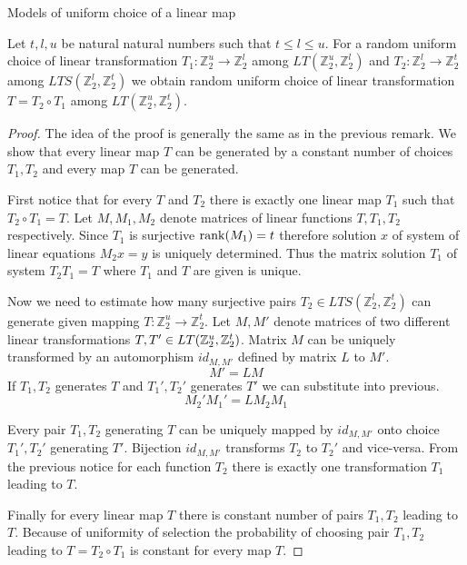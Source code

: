 \begin{section}{Models of uniform choice of a linear map}
\begin{remark}
Let $t, l, u$ be natural natural numbers such that $t \leq l \leq u$. For a random uniform choice of linear transformation $T_1: \mathbb{Z}_2^u \rightarrow \mathbb{Z}_2^l$ among $LT(\mathbb{Z}_2^u, \mathbb{Z}_2^l)$ and $T_2: \mathbb{Z}_2^l \rightarrow \mathbb{Z}_2^t$ among $LTS(\mathbb{Z}_2^l, \mathbb{Z}_2^t)$ we obtain random uniform choice of linear transformation $T = T_2 \circ T_1$ among $LT(\mathbb{Z}_2^u, \mathbb{Z}_2^t)$.
\end{remark}
\begin{proof}
The idea of the proof is generally the same as in the previous remark. We show that every linear map $T$ can be generated by a constant number of choices $T_1, T_2$ and every map $T$ can be generated.

First notice that for every $T$ and $T_2$ there is exactly one linear map $T_1$ such that $T_2 \circ T_1 = T$. Let $M, M_1, M_2$ denote matrices of linear functions $T, T_1, T_2$ respectively. Since $T_1$ is surjective $\mathrm{rank}(M_1) = t$ therefore solution $x$ of system of linear equations $M_2 x = y$ is uniquely determined. Thus the matrix solution $T_1$ of system $T_2 T_1 = T$ where $T_1$ and $T$ are given is unique.

Now we need to estimate how many surjective pairs $T_2 \in LTS(\mathbb{Z}_2^l, \mathbb{Z}_2^t)$ can generate given mapping $T: \mathbb{Z}_2^u \rightarrow \mathbb{Z}_2^t$. Let $M, M'$ denote matrices of two different linear transformations $T, T' \in LT(\mathbb{Z}_{2}^{u}, \mathbb{Z}_{2}^{t})$. Matrix $M$ can be uniquely transformed by an automorphism $id_{M, M'}$ defined by matrix $L$ to $M'$.
\[
	M' = LM
\]
If $T_1, T_2$ generates $T$ and $T_1', T_2'$ generates $T'$ we can substitute into previous.
\[
	M_2' M_1' = L M_2 M_1
\]

Every pair $T_1, T_2$ generating $T$ can be uniquely mapped by $id_{M, M'}$ onto choice $T_1', T_2'$ generating $T'$. Bijection $id_{M, M'}$ transforms $T_2$ to $T_2'$ and vice-versa. From the previous notice for each function $T_2$ there is exactly one transformation $T_1$ leading to $T$.

Finally for every linear map $T$ there is constant number of pairs $T_1, T_2$ leading to $T$. Because of uniformity of selection the probability of choosing pair $T_1, T_2$ leading to $T = T_2 \circ T_1$ is constant for every map $T$.
\end{proof}

\end{section}
